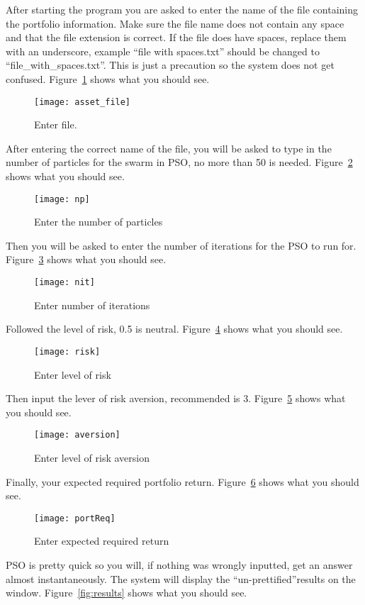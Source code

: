 After starting the program you are asked to enter the name of the file containing the portfolio information. Make sure the file name does not contain any space and that the file extension is correct. If the file does have spaces, replace them with an underscore, example ``file with spaces.txt'' should be changed to ``file\_with\_spaces.txt''. This is just a precaution so the system does not get confused. Figure~\ref{fig:asset_file} shows what you should see. 
\begin{figure}[H]
  \centering
    \texttt{[image: asset\_file]}
  \caption{Enter file.}
  \label{fig:asset_file}
\end{figure}
After entering the correct name of the file, you will be asked to type in the number of particles for the swarm in PSO, no more than 50 is needed. Figure~\ref{fig:np} shows what you should see. 
\begin{figure}[H]
  \centering
    \texttt{[image: np]}
  \caption{Enter the number of particles}
  \label{fig:np}
\end{figure}
Then you will be asked to enter the number of iterations for the PSO to run for. Figure~\ref{fig:nit} shows what you should see. 
\begin{figure}[H]
  \centering
    \texttt{[image: nit]}
  \caption{Enter number of iterations}
  \label{fig:nit}
\end{figure}
Followed the level of risk, 0.5 is neutral. Figure~\ref{fig:risk} shows what you should see. 
\begin{figure}[H]
  \centering
    \texttt{[image: risk]}
  \caption{Enter level of risk}
  \label{fig:risk}
\end{figure}
Then input the lever of risk aversion, recommended is 3. Figure~\ref{fig:aversion} shows what you should see. 
\begin{figure}[H]
  \centering
    \texttt{[image: aversion]}
  \caption{Enter level of risk aversion}
  \label{fig:aversion}
\end{figure}
Finally, your expected required portfolio return. Figure~\ref{fig:portReq} shows what you should see. 
\begin{figure}[H]
  \centering
    \texttt{[image: portReq]}
  \caption{Enter expected required return}
  \label{fig:portReq}
\end{figure} 
PSO is pretty quick so you will, if nothing was wrongly inputted, get an answer almost instantaneously. The system will display the ``un-prettified''results on the window. Figure~\ref{fig:results} shows what you should see. 
